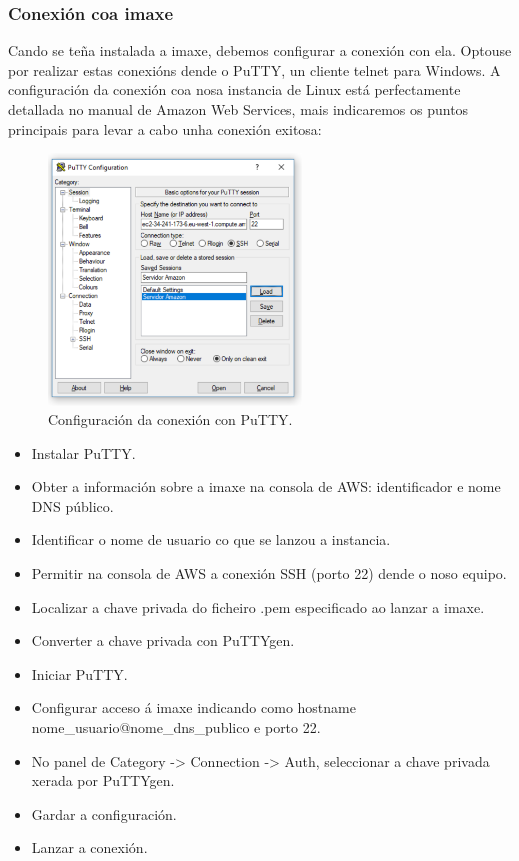 \subsubsection{Conexión coa imaxe}
Cando se teña instalada a imaxe, debemos configurar a conexión con ela. Optouse por realizar estas conexións dende o PuTTY, un cliente telnet para Windows. A configuración da conexión coa nosa instancia de Linux está perfectamente detallada no manual de Amazon Web Services, mais indicaremos os puntos principais para levar a cabo unha conexión exitosa:


\begin{figure}[h]
	\begin{center}
		\includegraphics[width=0.6\textwidth]{figures/capturas/putty}
		\caption{Configuración da conexión con PuTTY.}
		\label{fig:putty}
	\end{center}
\end{figure}

\begin{itemize}
	\item Instalar PuTTY.
	\item Obter a información sobre a imaxe na consola de AWS: identificador e nome DNS público.
	\item Identificar o nome de usuario co que se lanzou a instancia.
	\item Permitir na consola de AWS a conexión SSH (porto 22) dende o noso equipo.
	\item Localizar a chave privada do ficheiro .pem especificado ao lanzar a imaxe.
	\item Converter a chave privada con PuTTYgen.
	\item Iniciar PuTTY.
	\item Configurar acceso á imaxe indicando como hostname nome\_usuario@nome\_dns\_publico e porto 22.
	\item No panel de Category -> Connection -> Auth, seleccionar a chave privada xerada por PuTTYgen.
	\item Gardar a configuración.
	\item Lanzar a conexión.
\end{itemize}


